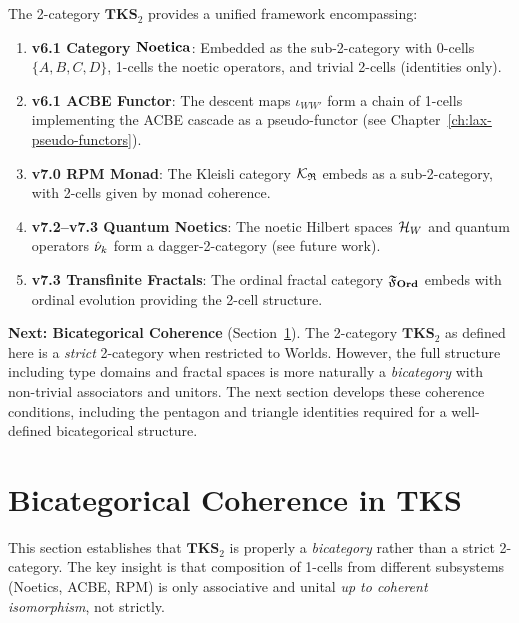 \begin{proposition}
\label{prop:tks-unification}
The 2-category $\mathbf{TKS}_2$ provides a unified framework encompassing:
\begin{enumerate}
  \item \textbf{v6.1 Category $\mathbf{Noetica}$}: Embedded as the sub-2-category with 0-cells
        $\{A,B,C,D\}$, 1-cells the noetic operators, and trivial 2-cells (identities only).
  \item \textbf{v6.1 ACBE Functor}: The descent maps $\iota_{WW'}$ form a chain of 1-cells
        implementing the ACBE cascade as a pseudo-functor (see Chapter~\ref{ch:lax-pseudo-functors}).
  \item \textbf{v7.0 RPM Monad}: The Kleisli category $\mathcal{K}_{\mathfrak{R}}$ embeds as a
        sub-2-category, with 2-cells given by monad coherence.
  \item \textbf{v7.2--v7.3 Quantum Noetics}: The noetic Hilbert spaces $\mathcal{H}_W$ and
        quantum operators $\hat{\nu}_{k}$ form a dagger-2-category (see future work).
  \item \textbf{v7.3 Transfinite Fractals}: The ordinal fractal category $\mathfrak{F}_{\mathbf{Ord}}$
        embeds with ordinal evolution providing the 2-cell structure.
\end{enumerate}
\end{proposition}

\begin{remark}
\textbf{Next: Bicategorical Coherence} (Section~\ref{sec:bicategorical-coherence}).
The 2-category $\mathbf{TKS}_2$ as defined here is a \emph{strict} 2-category when
restricted to Worlds. However, the full structure including type domains and fractal
spaces is more naturally a \emph{bicategory} with non-trivial associators and unitors.
The next section develops these coherence conditions, including the pentagon and
triangle identities required for a well-defined bicategorical structure.
\end{remark}

\section{Bicategorical Coherence in TKS}
\label{sec:bicategorical-coherence}

\begin{tcolorbox}[colback=green!5!white,colframe=green!75!black,title=\textbf{Coherence Requirements}]
This section establishes that $\mathbf{TKS}_2$ is properly a \emph{bicategory} rather than
a strict 2-category. The key insight is that composition of 1-cells from different
subsystems (Noetics, ACBE, RPM) is only associative and unital \emph{up to coherent
isomorphism}, not strictly.
\end{tcolorbox}

